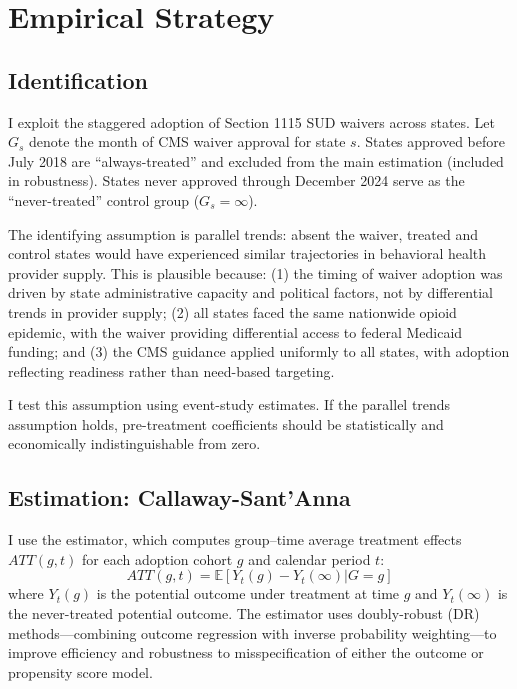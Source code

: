 \documentclass[12pt]{article}
\newcommand{\E}{\mathbb{E}}
\begin{document}
\section{Empirical Strategy}

\subsection{Identification}

I exploit the staggered adoption of Section 1115 SUD waivers across states. Let $G_s$ denote the month of CMS waiver approval for state $s$. States approved before July 2018 are ``always-treated'' and excluded from the main estimation (included in robustness). States never approved through December 2024 serve as the ``never-treated'' control group ($G_s = \infty$).

The identifying assumption is parallel trends: absent the waiver, treated and control states would have experienced similar trajectories in behavioral health provider supply. This is plausible because: (1) the timing of waiver adoption was driven by state administrative capacity and political factors, not by differential trends in provider supply; (2) all states faced the same nationwide opioid epidemic, with the waiver providing differential access to federal Medicaid funding; and (3) the CMS guidance applied uniformly to all states, with adoption reflecting readiness rather than need-based targeting.

I test this assumption using event-study estimates. If the parallel trends assumption holds, pre-treatment coefficients should be statistically and economically indistinguishable from zero.

\subsection{Estimation: Callaway-Sant'Anna}

I use the \citet{callaway2021difference} estimator, which computes group--time average treatment effects $ATT(g,t)$ for each adoption cohort $g$ and calendar period $t$:
\begin{equation}
    ATT(g,t) = \E[Y_t(g) - Y_t(\infty) | G = g]
\end{equation}
where $Y_t(g)$ is the potential outcome under treatment at time $g$ and $Y_t(\infty)$ is the never-treated potential outcome. The estimator uses doubly-robust (DR) methods---combining outcome regression with inverse probability weighting---to improve efficiency and robustness to misspecification of either the outcome or propensity score model.
\end{document}
